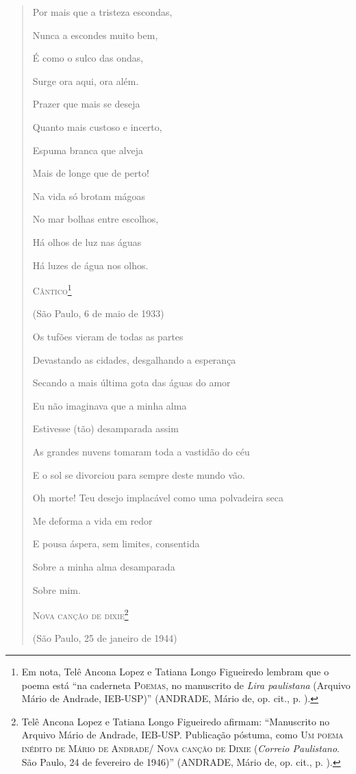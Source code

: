 \begin{verse}
Por mais que a tristeza escondas,

Nunca a escondes muito bem,

É como o sulco das ondas,

Surge ora aqui, ora além.

Prazer que mais se deseja

Quanto mais custoso e incerto,

Espuma branca que alveja

Mais de longe que de perto!

Na vida só brotam mágoas

No mar bolhas entre escolhos,

Há olhos de luz nas águas

Há luzes de água nos olhos.

\textsc{Cântico}\footnote{Em nota, Telê Ancona Lopez e Tatiana Longo
  Figueiredo lembram que o poema está ``na caderneta \textsc{Poemas}, no
  manuscrito de \emph{Lira paulistana} (Arquivo Mário de Andrade,
  IEB-USP)'' (ANDRADE, Mário de, op. cit., p. ).}

(São Paulo, 6 de maio de 1933)

Os tufões vieram de todas as partes

Devastando as cidades, desgalhando a esperança

Secando a mais última gota das águas do amor

Eu não imaginava que a minha alma

Estivesse (tão) desamparada assim

As grandes nuvens tomaram toda a vastidão do céu

E o sol se divorciou para sempre deste mundo vão.

Oh morte! Teu desejo implacável como uma polvadeira seca

Me deforma a vida em redor

E pousa áspera, sem limites, consentida

Sobre a minha alma desamparada

Sobre mim.

\textsc{Nova canção de dixie}\footnote{Telê Ancona Lopez e Tatiana Longo
  Figueiredo afirmam: ``Manuscrito no Arquivo Mário de Andrade, IEB-USP.
  Publicação póstuma, como \textsc{Um poema inédito de Mário de Andrade/
  Nova canção de Dixie} (\emph{Correio Paulistano}. São Paulo, 24 de
  fevereiro de 1946)'' (ANDRADE, Mário de, op. cit., p. ).}

(São Paulo, 25 de janeiro de 1944)


\end{verse}
